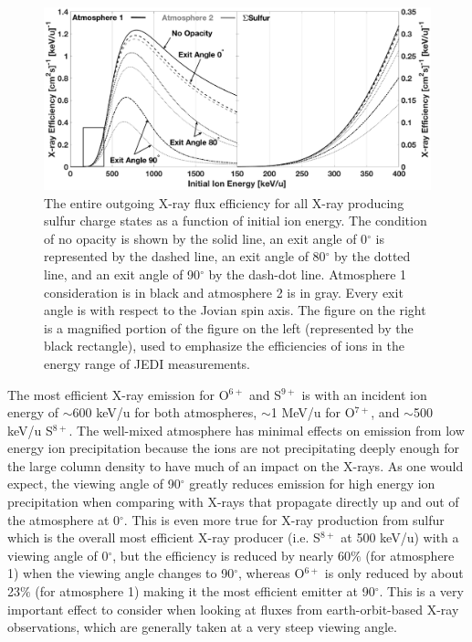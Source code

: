 \documentclass[draft]{agujournal2018}
\begin{document}
\begin{figure}[ht]
    \centering
    \includegraphics[width=\textwidth]{Figures/SulXrayEff2.eps}
    \caption{The entire outgoing X-ray flux efficiency for all X-ray producing sulfur charge states as a function of initial ion energy. The condition of no opacity is shown by the solid line, an exit angle of 0$^{\circ}$ is represented by the dashed line, an exit angle of 80$^{\circ}$ by the dotted line, and an exit angle of 90$^{\circ}$ by the dash-dot line. Atmosphere 1 consideration is in black and atmosphere 2 is in gray. Every exit angle is with respect to the Jovian spin axis. The figure on the right is a magnified portion of the figure on the left (represented by the black rectangle), used to emphasize the efficiencies of ions in the energy range of JEDI measurements.}
    \label{fig:SulXrayEff}
\end{figure}

The most efficient X-ray emission for O$^{6+}$ and S$^{9+}$ is with an incident ion energy of $\sim$600 keV/u for both atmospheres, $\sim$1 MeV/u for O$^{7+}$, and $\sim$500 keV/u S$^{8+}$.
The well-mixed atmosphere has minimal effects on emission from low energy ion precipitation because the ions are not precipitating deeply enough for the large column density to have much of an impact on the X-rays.
As one would expect, the viewing angle of 90$^{\circ}$ greatly reduces emission for high energy ion precipitation when comparing with X-rays that propagate directly up and out of the atmosphere at 0$^{\circ}$.
This is even more true for X-ray production from sulfur which is the overall most efficient X-ray producer (i.e. S$^{8+}$ at 500 keV/u) with a viewing angle of 0$^{\circ}$, but the efficiency is reduced by nearly 60$\%$ (for atmosphere 1) when the viewing angle changes to 90$^{\circ}$, whereas O$^{6+}$ is only reduced by about 23$\%$ (for atmosphere 1) making it the most efficient emitter at 90$^{\circ}$.
This is a very important effect to consider when looking at fluxes from earth-orbit-based X-ray observations, which are generally taken at a very steep viewing angle.
\end{document}
